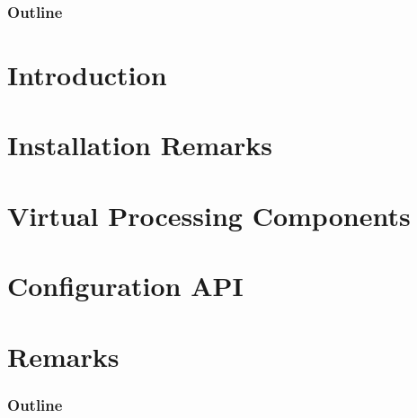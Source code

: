 \newcommand{\SysteMoC}{\emph{SysteMoC}}
\newcommand{\SystemCoDesigner}{\emph{SystemCoDesigner}}
\newcommand{\VPCs}{\emph{Virtual Processing Components}}
\newcommand{\VPC}{\emph{Virtual Processing Component}}
\newcommand{\concat}{{}^{\smallfrown}}
\newcommand{\length}{\#}

\makeindex



\frame[plain,c]{\titlepage} %

{
\lstset{commentstyle=\scriptsize\selectfont}
\lstset{basicstyle=\scriptsize\ttfamily\selectfont}
}

\begin{frame}
  \frametitle{Outline}
  \tableofcontents[hideallsubsections]
\end{frame}

\section{Introduction}


\section{Installation Remarks}


\section{Virtual Processing Components}


\section{Configuration API}



\section{Remarks}
\begin{frame}
  \frametitle{Outline}
\end{frame}


